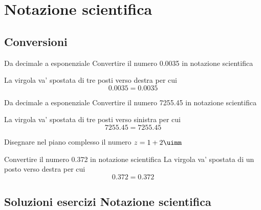 \chapter{Notazione scientifica}
\label{cha:Notazionescietifica}
 
\section{Conversioni}


\begin{esempiot}{Da decimale a esponenziale}{}
	Convertire il numero \num{0.0035} in notazione scientifica
\end{esempiot}
La virgola va' spostata di tre posti verso destra per cui
\[\num{0.0035}=\num[scientific-notation=true]{0.0035}\]
\begin{esempiot}{Da decimale a esponenziale}{}
	Convertire il numero \num{7255.45} in notazione scientifica
\end{esempiot}
La virgola va' spostata di tre posti verso sinistra per cui
\[\num{7255.45}=\num[scientific-notation=true]{7255.45}\]
\tcbstartrecording
\begin{exercise}[no solution]
	Disegnare nel piano complesso il numero $z=1+2\uimm$
\end{exercise}
\begin{exercise}
	Convertire il numero \num{0.372} in notazione scientifica
	\tcblower
	La virgola va' spostata di un posto verso destra per cui
	\[\num{0.372}=\num[scientific-notation=true]{0.372}\]
\end{exercise}
\tcbstoprecording
\section{Soluzioni esercizi Notazione scientifica}
\tcbinputrecords